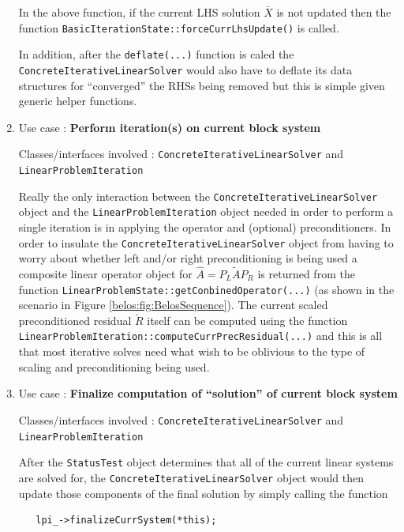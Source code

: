 \documentclass[pdf,ps2pdf,11pt]{SANDreport}
\begin{document}
\begin{enumerate}
In the above function, if the current LHS solution $\bar{X}$ is not
updated then the function
{}\texttt{Basic\-Iteration\-State\-::force\-Curr\-Lhs\-Update()} is
called.

In addition, after the {}\texttt{deflate(...)} function is caled the
{}\texttt{Concrete\-Iterative\-Linear\-Solver} would also have to deflate
its data structures for ``converged'' the RHSs being removed but this
is simple given generic helper functions.

{}\item Use case : \textbf{Perform iteration(s) on current block
system}

{}\noindent{}Classes/interfaces involved :
{}\texttt{Concrete\-Iterative\-Linear\-Solver} and
{}\texttt{Linear\-Problem\-Iteration}

Really the only interaction between the
{}\texttt{Concrete\-Iterative\-Linear\-Solver} object and the
{}\texttt{Linear\-Problem\-Iteration} object needed in order to
perform a single iteration is in applying the operator and (optional)
preconditioners.  In order to insulate the
{}\texttt{Concrete\-Iterative\-Linear\-Solver} object from having to worry
about whether left and/or right preconditioning is being used a
composite linear operator object for $\hat{A} = P_L \tilde{A} P_R$ is
returned from the function
{}\texttt{Linear\-Problem\-State::\-get\-Conbined\-Operator(...)} (as
shown in the scenario in Figure {}\ref{belos:fig:BelosSequence}).  The
current scaled preconditioned residual $\breve{R}$ itself can be
computed using the function
{}\texttt{Linear\-Problem\-Iteration::\-compute\-Curr\-Prec\-Residual(...)} 
and this is all that most iterative solves need what wish to be
oblivious to the type of scaling and preconditioning being used.

{}\item Use case : \textbf{Finalize computation of ``solution'' of
current block system}

{}\noindent{}Classes/interfaces involved :
{}\texttt{Concrete\-Iterative\-Linear\-Solver} and
{}\texttt{Linear\-Problem\-Iteration}

After the {}\texttt{Status\-Test} object determines that all of the
current linear systems are solved for, the
{}\texttt{Concrete\-Iterative\-Linear\-Solver} object would then
update those components of the final solution by simply calling the
function

{\scriptsize\begin{verbatim}
   lpi_->finalizeCurrSystem(*this);
\end{verbatim}}


\end{enumerate}
\end{document}
